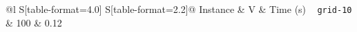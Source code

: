 \documentclass{article}
\begin{document}
\begin{tabular}{@{}l S[table-format=4.0] S[table-format=2.2]@{}}
  \toprule
  Instance & {V} & {Time (s)} \
  \midrule
  \texttt{grid-10} &  100 &  0.12 \
  \bottomrule
\end{tabular}
\end{document}
